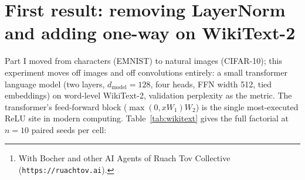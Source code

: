 \documentclass[11pt]{article}
\author{Heath\thanks{With Bocher and other AI Agents of Ruach Tov
Collective (\texttt{https://ruachtov.ai}).}}
\newcommand{\modelEmnistNet}{\textsc{EmnistNet}\xspace}
\newcommand{\modelVggEleven}{\textsc{Vgg-11}\xspace}
\begin{document}

\begin{abstract}
Part I~\cite{partone} established that the backward convention at the rectifier's
kink is a free experimental parameter with large, regime-dependent
effects: one-way training is more accurate where units squelch
(\modelEmnistNet{} $+0.40$, CIFAR-10 $+2.61$), less accurate where
squelching serves as implicit capacity pruning (\modelVggEleven{}
$-3.1$ under Adam), and interacts with LayerNorm so strongly that the
normalizer stably reverses the direction of its effect on a small
transformer. Part II opens with that transformer result in full --- withheld
from Part I pending the decomposition it demands --- and lays out
the program the Part I results open. We propose:
(1) \emph{unit telemetry} --- instrumented kernels that detect
the moment a unit would go silent and record the circumstances,
enabling a causal trial of whether the silenced condition
\emph{spreads} through a network, the directions of its spreading
mechanisms, and whether single-layer one-way reconditioning
\emph{interrupts} the spread; (2) a direct study of when
silenced units indicate a problem and when they are useful pruning,
including the dropout interaction; and (3) a decomposition of
LayerNorm into three primitives --- mean-shift, symmetric
deviation-scale, and a novel \emph{balanced} (per-side) deviation
scale built on the positive/negative semideviation --- factorially
recombined to locate which ingredient reverses one-way's effect.
\end{abstract}

\section{First result: removing LayerNorm and adding one-way on WikiText-2}
\label{sec:wikitext}

Part I moved from characters (EMNIST) to natural images
(CIFAR-10); this experiment moves off images and off convolutions
entirely: a small transformer language model (two layers,
$d_{\mathrm{model}}{=}128$, four heads, FFN width 512, tied
embeddings) on word-level WikiText-2, validation perplexity as the
metric. The transformer's feed-forward block ($\max(0, xW_1)W_2$) is
the single most-executed ReLU site in modern computing. Table~\ref{tab:wikitext} gives the full factorial at $n{=}10$
paired seeds per cell:
\end{document}
